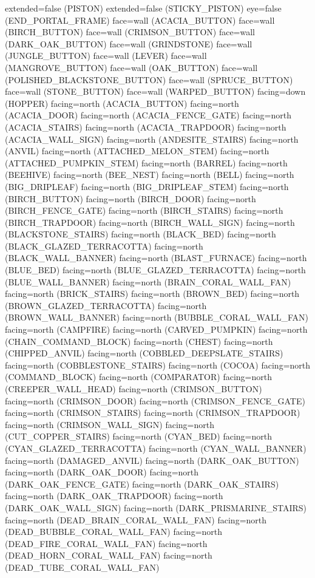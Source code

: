 \documentclass[11pt]{article}
\begin{document}
extended=false (PISTON)
extended=false (STICKY_PISTON)
eye=false (END_PORTAL_FRAME)
face=wall (ACACIA_BUTTON)
face=wall (BIRCH_BUTTON)
face=wall (CRIMSON_BUTTON)
face=wall (DARK_OAK_BUTTON)
face=wall (GRINDSTONE)
face=wall (JUNGLE_BUTTON)
face=wall (LEVER)
face=wall (MANGROVE_BUTTON)
face=wall (OAK_BUTTON)
face=wall (POLISHED_BLACKSTONE_BUTTON)
face=wall (SPRUCE_BUTTON)
face=wall (STONE_BUTTON)
face=wall (WARPED_BUTTON)
facing=down (HOPPER)
facing=north (ACACIA_BUTTON)
facing=north (ACACIA_DOOR)
facing=north (ACACIA_FENCE_GATE)
facing=north (ACACIA_STAIRS)
facing=north (ACACIA_TRAPDOOR)
facing=north (ACACIA_WALL_SIGN)
facing=north (ANDESITE_STAIRS)
facing=north (ANVIL)
facing=north (ATTACHED_MELON_STEM)
facing=north (ATTACHED_PUMPKIN_STEM)
facing=north (BARREL)
facing=north (BEEHIVE)
facing=north (BEE_NEST)
facing=north (BELL)
facing=north (BIG_DRIPLEAF)
facing=north (BIG_DRIPLEAF_STEM)
facing=north (BIRCH_BUTTON)
facing=north (BIRCH_DOOR)
facing=north (BIRCH_FENCE_GATE)
facing=north (BIRCH_STAIRS)
facing=north (BIRCH_TRAPDOOR)
facing=north (BIRCH_WALL_SIGN)
facing=north (BLACKSTONE_STAIRS)
facing=north (BLACK_BED)
facing=north (BLACK_GLAZED_TERRACOTTA)
facing=north (BLACK_WALL_BANNER)
facing=north (BLAST_FURNACE)
facing=north (BLUE_BED)
facing=north (BLUE_GLAZED_TERRACOTTA)
facing=north (BLUE_WALL_BANNER)
facing=north (BRAIN_CORAL_WALL_FAN)
facing=north (BRICK_STAIRS)
facing=north (BROWN_BED)
facing=north (BROWN_GLAZED_TERRACOTTA)
facing=north (BROWN_WALL_BANNER)
facing=north (BUBBLE_CORAL_WALL_FAN)
facing=north (CAMPFIRE)
facing=north (CARVED_PUMPKIN)
facing=north (CHAIN_COMMAND_BLOCK)
facing=north (CHEST)
facing=north (CHIPPED_ANVIL)
facing=north (COBBLED_DEEPSLATE_STAIRS)
facing=north (COBBLESTONE_STAIRS)
facing=north (COCOA)
facing=north (COMMAND_BLOCK)
facing=north (COMPARATOR)
facing=north (CREEPER_WALL_HEAD)
facing=north (CRIMSON_BUTTON)
facing=north (CRIMSON_DOOR)
facing=north (CRIMSON_FENCE_GATE)
facing=north (CRIMSON_STAIRS)
facing=north (CRIMSON_TRAPDOOR)
facing=north (CRIMSON_WALL_SIGN)
facing=north (CUT_COPPER_STAIRS)
facing=north (CYAN_BED)
facing=north (CYAN_GLAZED_TERRACOTTA)
facing=north (CYAN_WALL_BANNER)
facing=north (DAMAGED_ANVIL)
facing=north (DARK_OAK_BUTTON)
facing=north (DARK_OAK_DOOR)
facing=north (DARK_OAK_FENCE_GATE)
facing=north (DARK_OAK_STAIRS)
facing=north (DARK_OAK_TRAPDOOR)
facing=north (DARK_OAK_WALL_SIGN)
facing=north (DARK_PRISMARINE_STAIRS)
facing=north (DEAD_BRAIN_CORAL_WALL_FAN)
facing=north (DEAD_BUBBLE_CORAL_WALL_FAN)
facing=north (DEAD_FIRE_CORAL_WALL_FAN)
facing=north (DEAD_HORN_CORAL_WALL_FAN)
facing=north (DEAD_TUBE_CORAL_WALL_FAN)
\end{document}
